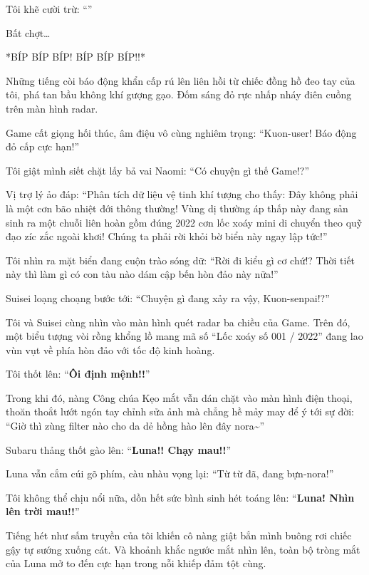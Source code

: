 \documentclass[../main.tex]{subfiles}
\begin{document}
Tôi khẽ cười trừ: ``''

Bất chợt\dots

*BÍP BÍP BÍP! BÍP BÍP BÍP!!*

Những tiếng còi báo động khẩn cấp rú lên liên hồi từ chiếc đồng hồ đeo tay của tôi, phá tan bầu không khí gượng gạo. Đốm sáng đỏ rực nhấp nháy điên cuồng trên màn hình radar.

Game cất giọng hối thúc, âm điệu vô cùng nghiêm trọng: ``Kuon-user! Báo động đỏ cấp cực hạn!''

Tôi giật mình siết chặt lấy bả vai Naomi: ``Có chuyện gì thế Game!?''

Vị trợ lý ảo đáp: ``Phân tích dữ liệu vệ tinh khí tượng cho thấy: Đây không phải là một cơn bão nhiệt đới thông thường! Vùng dị thường áp thấp này đang sản sinh ra một chuỗi liên hoàn gồm đúng 2022 cơn lốc xoáy mini di chuyển theo quỹ đạo zíc zắc ngoài khơi! Chúng ta phải rời khỏi bờ biển này ngay lập tức!''

Tôi nhìn ra mặt biển đang cuộn trào sóng dữ: ``Rời đi kiểu gì cơ chứ!? Thời tiết này thì làm gì có con tàu nào dám cập bến hòn đảo này nữa!''

Suisei loạng choạng bước tới: ``Chuyện gì đang xảy ra vậy, Kuon-senpai!?''

Tôi và Suisei cùng nhìn vào màn hình quét radar ba chiều của Game. Trên đó, một biểu tượng vòi rồng khổng lồ mang mã số ``Lốc xoáy số 001 / 2022'' đang lao vùn vụt về phía hòn đảo với tốc độ kinh hoàng.

Tôi thốt lên: ``\textbf{Ôi định mệnh!!}''

Trong khi đó, nàng Công chúa Kẹo mắt vẫn dán chặt vào màn hình điện thoại, thoăn thoắt lướt ngón tay chỉnh sửa ảnh mà chẳng hề mảy may để ý tới sự đời: ``Giờ thì zùng filter nào cho da dẻ hồng hào lên đây nora\~{}''

Subaru thảng thốt gào lên: ``\textbf{Luna!! Chạy mau!!}''

Luna vẫn cắm cúi gõ phím, càu nhàu vọng lại: ``Từ từ đã, đang bựn-nora!''

Tôi không thể chịu nổi nữa, dồn hết sức bình sinh hét toáng lên: ``\textbf{Luna! Nhìn lên trời mau!!}''

Tiếng hét như sấm truyền của tôi khiến cô nàng giật bắn mình buông rơi chiếc gậy tự sướng xuống cát. Và khoảnh khắc ngước mắt nhìn lên, toàn bộ tròng mắt của Luna mở to đến cực hạn trong nỗi khiếp đảm tột cùng.

\end{document}
